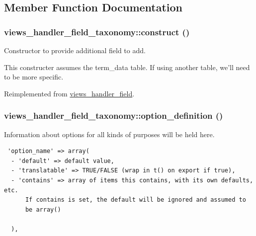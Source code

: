 \subsection{Member Function Documentation}
\hypertarget{classviews__handler__field__taxonomy_7020806fbe7b4b7c182c422dd327b0fc}{
\subsubsection[{construct}]{\setlength{\rightskip}{0pt plus 5cm}views\_\-handler\_\-field\_\-taxonomy::construct ()}}
\label{classviews__handler__field__taxonomy_7020806fbe7b4b7c182c422dd327b0fc}


Constructor to provide additional field to add.

This constructer assumes the term\_\-data table. If using another table, we'll need to be more specific. 

Reimplemented from \hyperlink{classviews__handler__field_3d50050864c255b71c842972a45d39f6}{views\_\-handler\_\-field}.\hypertarget{classviews__handler__field__taxonomy_c32837e44167ccaf8901f9782298c75b}{
\subsubsection[{option\_\-definition}]{\setlength{\rightskip}{0pt plus 5cm}views\_\-handler\_\-field\_\-taxonomy::option\_\-definition ()}}
\label{classviews__handler__field__taxonomy_c32837e44167ccaf8901f9782298c75b}


Information about options for all kinds of purposes will be held here. 

\begin{Code}\begin{verbatim} 'option_name' => array(
  - 'default' => default value,
  - 'translatable' => TRUE/FALSE (wrap in t() on export if true),
  - 'contains' => array of items this contains, with its own defaults, etc.
      If contains is set, the default will be ignored and assumed to
      be array()

  ),
\end{verbatim}
\end{Code}

